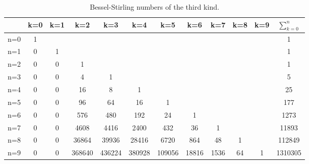 \documentclass[a4paper]{amsart}
\begin{document}
\begin{table}[]
    \centering
    \begin{tabular}{|l|*{10}{c}|c|}
        \hline
          & k=0 & k=1 & k=2   & k=3   & k=4   & k=5   & k=6   & k=7   & k=8   & k=9   & $\sum_{k=0}^{n}$ \\
        \hline
        n=0 & 1   &     &       &       &       &       &       &       &       &       & 1                  \\
        n=1 & 0   & 1   &       &       &       &       &       &       &       &       & 1                  \\
        n=2 & 0   & 0   & 1     &       &       &       &       &       &       &       & 1                  \\
        n=3 & 0   & 0   & 4     & 1     &       &       &       &       &       &       & 5                  \\
        n=4 & 0   & 0   & 16    & 8     & 1     &       &       &       &       &       & 25                 \\
        n=5 & 0   & 0   & 96    & 64    & 16    & 1     &       &       &       &       & 177                \\
        n=6 & 0   & 0   & 576   & 480   & 192   & 24    & 1     &       &       &       & 1273               \\
        n=7 & 0   & 0   & 4608  & 4416  & 2400  & 432   & 36    & 1     &       &       & 11893              \\
        n=8 & 0   & 0   & 36864 & 39936 & 28416 & 6720  & 864   & 48    & 1     &       & 112849             \\
        n=9 & 0   & 0   & 368640& 436224& 380928& 109056& 18816 & 1536  & 64    & 1     & 1310305            \\
        \hline
    \end{tabular}
    \bigskip
    \caption{Bessel-Stirling numbers of the third kind.}
    \label{tab-bessel-stirling3}
\end{table}
\end{document}
